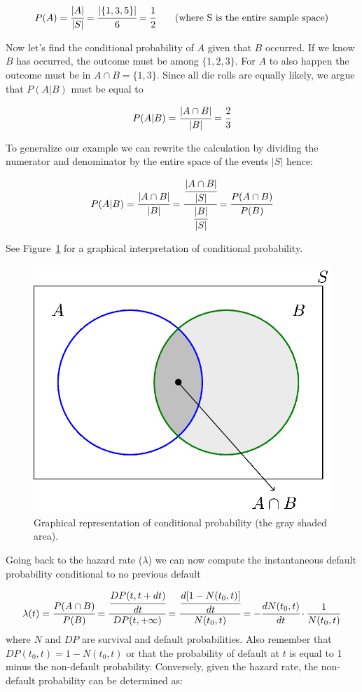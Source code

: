 \begin{equation}
P(A) = \cfrac{|A|}{|S|} = \cfrac{|\{1,3,5\}|}{6} = \cfrac{1}{2}\qquad\textrm{(where S is the entire sample space)}\end{equation}

Now let's find the conditional probability of \(A\) given that \(B\)
occurred. If we know \(B\) has occurred, the outcome must be among
\(\{1,2,3\}\). For \(A\) to also happen the outcome must be in
\(A\cap B = \{1,3\}\). Since all die rolls are equally likely, we argue
that \(P(A|B)\) must be equal to

\begin{equation}P(A|B) = \cfrac{|A\cap B|}{|B|} = \cfrac{2}{3}\end{equation}

To generalize our example we can rewrite the calculation by dividing the
numerator and denominator by the entire space of the events \(|S|\)
hence:

\begin{equation}P(A|B) = \cfrac{|A\cap B|}{|B|} = \cfrac{\cfrac{|A\cap B|}{|S|}}{\cfrac{|B|}{|S|}} = \cfrac{P(A\cap B)}{P(B)}
\end{equation}

See Figure~\ref{fig:conditional_prob} for a graphical interpretation of
conditional probability.

\begin{figure}[tb]
\centering
\includegraphics[width=0.5\linewidth]{figures/conditional_b.png}
\caption{Graphical representation of conditional probability (the gray shaded area).}
\label{fig:conditional_prob}
\end{figure}

Going back to the hazard rate ($\lambda$) we can now compute the instantaneous default probability conditional to no previous default 

\begin{equation}
\lambda(t) = \cfrac{P(A\cap B)}{P(B)} = \cfrac{\cfrac{DP(t, t+dt)}{dt}}{DP(t, +\infty)} = \cfrac{\cfrac{d[1-N(t_0, t)]}{dt}}{N(t_0, t)} = -\cfrac{dN(t_0, t)}{dt}\cdot\frac{1}{N(t_0, t)}
\end{equation}
where $N$ and $DP$ are survival and default probabilities.
Also remember that $DP(t_0, t) = 1 - N(t_0, t)$ or that the probability of default at $t$ is equal to 1 minus the non-default probability.
Conversely, given the hazard rate, the non-default probability can be
determined as:


